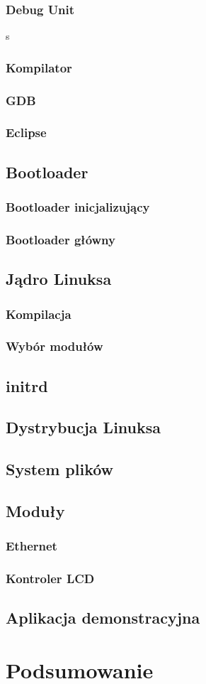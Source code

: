 \documentclass[a4paper,12pt]{book}
\begin{document}
				
				
			\subsection{Debug Unit}
				s
			\subsection{Kompilator}
			\subsection{GDB}
			\subsection{Eclipse}
		\section{Bootloader}
			\subsection{Bootloader inicjalizujący}
			\subsection{Bootloader główny}
		\section{Jądro Linuksa}
			\subsection{Kompilacja}
			\subsection{Wybór modułów}
		\section{initrd}
		\section{Dystrybucja Linuksa}
		\section{System plików}
		\section{Moduły}
			\subsection{Ethernet}
			\subsection{Kontroler LCD}
		\section{Aplikacja demonstracyjna}
		
	\chapter{Podsumowanie}

	
	
\end{document}
